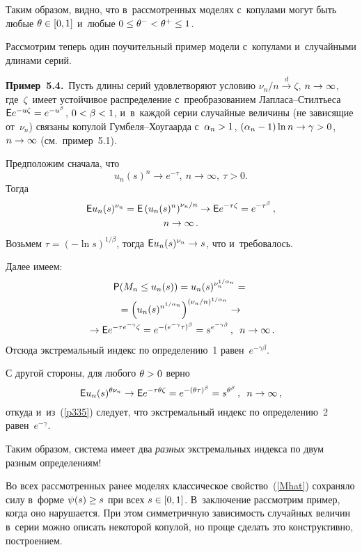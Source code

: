 \begin{multicols}{2}
Таким образом, видно, что в~рассмотренных моделях
с~копулами могут быть любые $\theta\hm\in [0,1]$
и~любые $0\hm\le\theta^-\hm<\theta^+\hm\le 1$.

Рассмотрим теперь один поучительный пример модели
с~копулами и~случайными длинами серий.

\smallskip

\noindent
\textbf{Пример~5.4.}\ Пусть длины серий удовлетворяют условию
$\nu_n/n\stackrel{d}{\to}\zeta$, $n\hm\to\infty$, где~$\zeta$~имеет
устойчивое распределение с~преобразованием
Лап\-ла\-са--Стилть\-еса ${\sf E}e^{-u\zeta}\hm=e^{-u^\beta}$,
$0\hm<\beta\hm<1$, и~в~каж\-дой серии случайные величины
(не зависящие от~$\nu_n$) связаны копулой Гум\-бе\-ля--Хоу\-га\-ар\-да
с~$\alpha_n\hm>1$, $(\alpha_n-1)\ln n\hm\to\gamma>0$,
$n\hm\to\infty$ (см.\ пример~5.1).

Предположим сначала, что 
$$
u_n(s)^n\to e^{-\tau},\ n\to\infty,\ \tau>0.
$$ 
Тогда
\begin{multline*}
{\sf E}u_n(s)^{\nu_n}={\sf E}\left(u_n(s)^n\right)^{\nu_n/n}\to
{\sf E}e^{-\tau\zeta}=e^{-\tau^\beta}\,,\\
 n\to\infty\,.
\end{multline*}
Возьмем $\tau=(-\ln s)^{1/\beta}$, тогда ${\sf E}u_n(s)^{\nu_n}\hm\to s$, что и~требовалось.

Далее имеем:
\begin{multline}
\label{p335}
{\sf P}(M_n\le u_n(s))=u_n(s)^{\nu_n^{1/\alpha_n}}={}\\
{}=
\left(u_n(s)^{n^{1/\alpha_n}}\right)^{(\nu_n/n)^{1/\alpha_n}}\to{}\\
{}\to{\sf E}e^{-\tau e^{-\gamma}\zeta}=
e^{-(e^{-\gamma}\tau)^\beta}=s^{e^{-\gamma\beta}}\,,\enskip n\to\infty\,.
\end{multline}
Отсюда экстремальный индекс по определению~1 равен~$e^{-\gamma\beta}$.

С другой стороны, для любого $\theta\hm>0$ верно
$$
{\sf E}u_n(s)^{\theta\nu_n}\to
{\sf E}e^{-\tau\theta\zeta}=e^{-(\theta\tau)^\beta}=s^{\theta^\beta}\,,\enskip
n\to\infty\,,
$$
откуда и~из~(\ref{p335}) следует, что экстремальный индекс по определению~2
равен~$e^{-\gamma}$.

Таким образом, система имеет два \textit{разных} экстремальных индекса
по двум разным определениям!

Во всех рассмотренных ранее моделях классическое свойство~(\ref{Mhat})
сохраняло силу в~форме $\psi(s)\hm\ge s$ при всех $s\hm\in [0,1]$.
В~заключение рассмотрим пример, когда оно нарушается. При этом
симметричную зависимость случайных величин в~серии можно описать некоторой копулой,
но проще сделать это конструктивно, построением.


\end{multicols}
